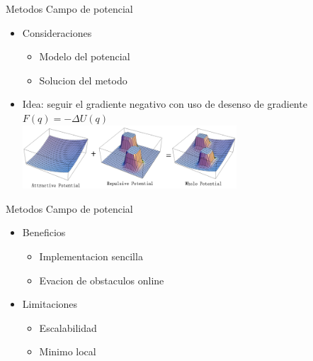 \documentclass[
	11pt, %
]{beamer}
\begin{document}
\begin{frame}{Metodos Campo de potencial}
  \begin{itemize}
  \item Consideraciones\\
    \begin{itemize}
    \item Modelo del potencial
    \item Solucion del metodo
    \end{itemize}
  \item Idea: seguir el gradiente negativo con uso de desenso de gradiente\\
    \centering
    $F(q)=-\Delta U(q)$\\
    \bigskip %
    \includegraphics[width=8cm]{potential-field1_robot.jpg}
  \end{itemize}
\end{frame}

\begin{frame}{Metodos Campo de potencial}
  \begin{itemize}
  \item Beneficios\\
    \begin{itemize}
    \item Implementacion sencilla
    \item Evacion de obstaculos online
    \end{itemize}
  \item Limitaciones\\
    \begin{itemize}
    \item Escalabilidad
    \item Minimo local
    \end{itemize}
  \end{itemize}
\end{frame}
\end{document}

